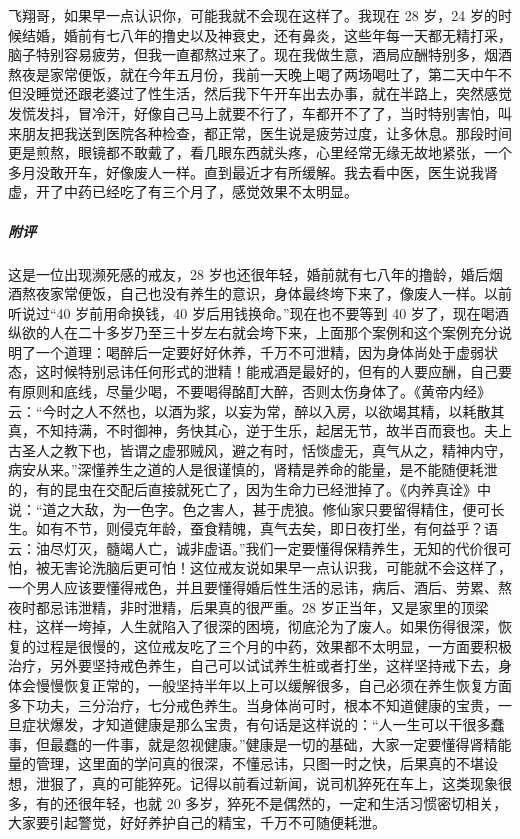 \begin{case}
    飞翔哥，如果早一点认识你，可能我就不会现在这样了。我现在 28 岁，24 岁的时候结婚，婚前有七八年的撸史以及神衰史，还有鼻炎，这些年每一天都无精打采，脑子特别容易疲劳，但我一直都熬过来了。现在我做生意，酒局应酬特别多，烟酒熬夜是家常便饭，就在今年五月份，我前一天晚上喝了两场喝吐了，第二天中午不但没睡觉还跟老婆过了性生活，然后我下午开车出去办事，就在半路上，突然感觉发慌发抖，冒冷汗，好像自己马上就要不行了，车都开不了了，当时特别害怕，叫来朋友把我送到医院各种检查，都正常，医生说是疲劳过度，让多休息。那段时间更是煎熬，眼镜都不敢戴了，看几眼东西就头疼，心里经常无缘无故地紧张，一个多月没敢开车，好像废人一样。直到最近才有所缓解。我去看中医，医生说我肾虚，开了中药已经吃了有三个月了，感觉效果不太明显。
    \subparagraph{附评} 这是一位出现濒死感的戒友，28 岁也还很年轻，婚前就有七八年的撸龄，婚后烟酒熬夜家常便饭，自己也没有养生的意识，身体最终垮下来了，像废人一样。以前听说过“40 岁前用命换钱，40 岁后用钱换命。”现在也不要等到 40 岁了，现在喝酒纵欲的人在二十多岁乃至三十岁左右就会垮下来，上面那个案例和这个案例充分说明了一个道理：喝醉后一定要好好休养，千万不可泄精，因为身体尚处于虚弱状态，这时候特别忌讳任何形式的泄精！能戒酒是最好的，但有的人要应酬，自己要有原则和底线，尽量少喝，不要喝得酩酊大醉，否则太伤身体了。《黄帝内经》云：“今时之人不然也，以酒为浆，以妄为常，醉以入房，以欲竭其精，以耗散其真，不知持满，不时御神，务快其心，逆于生乐，起居无节，故半百而衰也。夫上古圣人之教下也，皆谓之虚邪贼风，避之有时，恬惔虚无，真气从之，精神内守，病安从来。”深懂养生之道的人是很谨慎的，肾精是养命的能量，是不能随便耗泄的，有的昆虫在交配后直接就死亡了，因为生命力已经泄掉了。《内养真诠》中说：“道之大敌，为一色字。色之害人，甚于虎狼。修仙家只要留得精住，便可长生。如有不节，则侵克年龄，蚕食精魄，真气去矣，即日夜打坐，有何益乎？语云：油尽灯灭，髓竭人亡，诚非虚语。”我们一定要懂得保精养生，无知的代价很可怕，被无害论洗脑后更可怕！这位戒友说如果早一点认识我，可能就不会这样了，一个男人应该要懂得戒色，并且要懂得婚后性生活的忌讳，病后、酒后、劳累、熬夜时都忌讳泄精，非时泄精，后果真的很严重。28 岁正当年，又是家里的顶梁柱，这样一垮掉，人生就陷入了很深的困境，彻底沦为了废人。如果伤得很深，恢复的过程是很慢的，这位戒友吃了三个月的中药，效果都不太明显，一方面要积极治疗，另外要坚持戒色养生，自己可以试试养生桩或者打坐，这样坚持戒下去，身体会慢慢恢复正常的，一般坚持半年以上可以缓解很多，自己必须在养生恢复方面多下功夫，三分治疗，七分戒色养生。当身体尚可时，根本不知道健康的宝贵，一旦症状爆发，才知道健康是那么宝贵，有句话是这样说的：“人一生可以干很多蠢事，但最蠢的一件事，就是忽视健康。”健康是一切的基础，大家一定要懂得肾精能量的管理，这里面的学问真的很深，不懂忌讳，只图一时之快，后果真的不堪设想，泄狠了，真的可能猝死。记得以前看过新闻，说司机猝死在车上，这类现象很多，有的还很年轻，也就 20 多岁，猝死不是偶然的，一定和生活习惯密切相关，大家要引起警觉，好好养护自己的精宝，千万不可随便耗泄。
\end{case}

